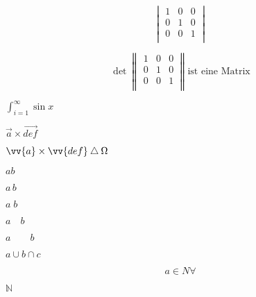 \documentclass[12pt,ngerman,parskip=half]{scrartcl}
\begin{document}
\[%
\begin{vmatrix} 
1 & 0 & 0 \\ 
0 & 1 & 0 \\ 
0 & 0 & 1 \\ 
\end{vmatrix}
\]

\[%
\det 
\begin{Vmatrix} 
1 & 0 & 0 \\ 
0 & 1 & 0 \\ 
0 & 0 & 1 \\ 
\end{Vmatrix}
\text{ist eine Matrix}
\]

\( \int_{i=1}^{\infty} \sin x \)

\( \vec{a} \times \vec{def} \)

\( \vv{a} \times \vv{def} \bigtriangleup \Omega  \)



\( ab \) %

\(a\,b \)

\(a\;b\)

\(a\quad b\)

\(a\qquad b\)

\(a \cup b \cap c\)

\[ a \in N \forall  \]

\(  \mathbb{N} \)
\end{document}
